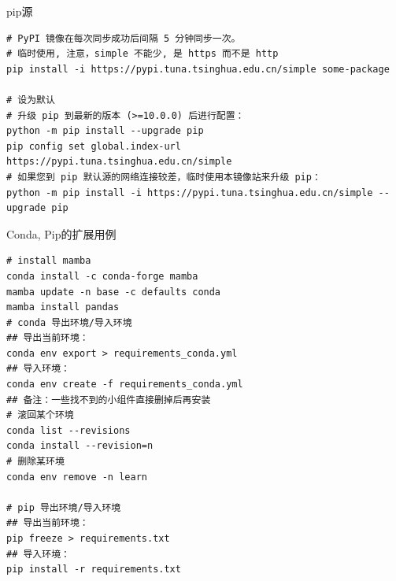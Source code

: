 \begin{frame}[fragile]{pip源}
    \begin{lstlisting}
# PyPI 镜像在每次同步成功后间隔 5 分钟同步一次。
# 临时使用, 注意，simple 不能少, 是 https 而不是 http
pip install -i https://pypi.tuna.tsinghua.edu.cn/simple some-package

# 设为默认
# 升级 pip 到最新的版本 (>=10.0.0) 后进行配置：
python -m pip install --upgrade pip
pip config set global.index-url https://pypi.tuna.tsinghua.edu.cn/simple
# 如果您到 pip 默认源的网络连接较差，临时使用本镜像站来升级 pip：
python -m pip install -i https://pypi.tuna.tsinghua.edu.cn/simple --upgrade pip
    \end{lstlisting}
\end{frame}


\begin{frame}[fragile]{Conda, Pip的扩展用例}
    \begin{lstlisting}
# install mamba
conda install -c conda-forge mamba
mamba update -n base -c defaults conda
mamba install pandas
# conda 导出环境/导入环境
## 导出当前环境：
conda env export > requirements_conda.yml
## 导入环境：
conda env create -f requirements_conda.yml
## 备注：一些找不到的小组件直接删掉后再安装
# 滚回某个环境
conda list --revisions
conda install --revision=n
# 删除某环境
conda env remove -n learn

# pip 导出环境/导入环境
## 导出当前环境：
pip freeze > requirements.txt
## 导入环境：
pip install -r requirements.txt
    \end{lstlisting}
\end{frame}